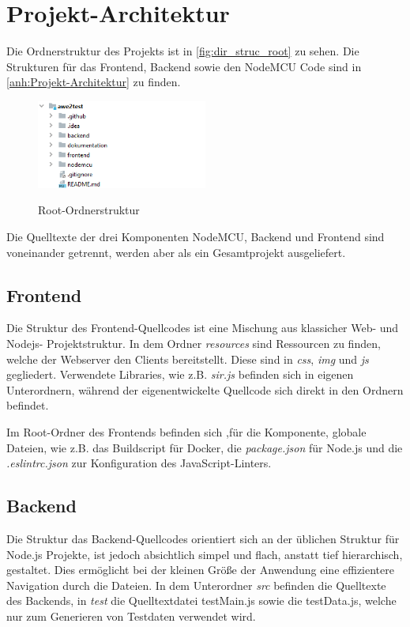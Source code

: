 

\section{Projekt-Architektur}\label{Projekt-Architektur}
Die Ordnerstruktur des Projekts ist in \autoref{fig:dir_struc_root} zu sehen.
Die Strukturen für das Frontend, Backend sowie den NodeMCU Code sind in \autoref{anh:Projekt-Architektur} zu finden.

\begin{figure}[H]
    \centering
    \begin{minipage}[t]{1\textwidth}
        \caption{Root-Ordnerstruktur}
        \includegraphics[width=0.5\textwidth]{img/dir_struc_root.png}\\
        \label{fig:dir_struc_root}
    \end{minipage}
\end{figure}

Die Quelltexte der drei Komponenten NodeMCU, Backend und Frontend sind voneinander getrennt, werden aber als ein Gesamtprojekt ausgeliefert.

\subsection{Frontend}
Die Struktur des Frontend-Quellcodes ist eine Mischung aus klassicher Web- und Nodejs- Projektstruktur.
In dem Ordner \textit{resources} sind Ressourcen zu finden, welche der Webserver den Clients bereitstellt.
Diese sind in \textit{css}, \textit{img} und \textit{js} gegliedert.
Verwendete Libraries, wie z.B. \textit{sir.js} befinden sich in eigenen Unterordnern, während der eigenentwickelte
Quellcode sich direkt in den Ordnern befindet.

Im Root-Ordner des Frontends befinden sich ,für die Komponente, globale Dateien, wie z.B. das Buildscript für Docker,
die \textit{package.json} für Node.js und die \textit{.eslintrc.json} zur Konfiguration des JavaScript-Linters.

\subsection{Backend}
Die Struktur das Backend-Quellcodes orientiert sich an der üblichen Struktur für Node.js Projekte, ist jedoch
absichtlich simpel und flach, anstatt tief hierarchisch, gestaltet.
Dies ermöglicht bei der kleinen Größe der Anwendung eine effizientere Navigation durch die Dateien.
In dem Unterordner \textit{src} befinden die Quelltexte des Backends, in \textit{test} die Quelltextdatei testMain.js
sowie die testData.js, welche nur zum Generieren von Testdaten verwendet wird.
